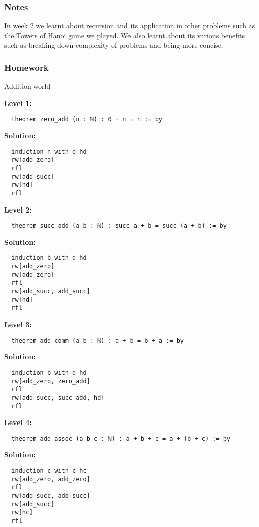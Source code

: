 \documentclass{article}
\theoremstyle{theorem}
\theoremstyle{definition}
\theoremstyle{remark}
\begin{document}
\subsubsection*{Notes}

In week 2 we learnt about recursion and its application in other problems such as the Towers of Hanoi game we played. We also learnt about its various benefits such as breaking down complexity of problems and being more concise.

\subsubsection*{Homework}

Addition world
\begin{enumerate}

  \textbf{Level 1:}
  \begin{verbatim}
  theorem zero_add (n : ℕ) : 0 + n = n := by
  \end{verbatim}

  \textbf{Solution:}
  \begin{verbatim}
  induction n with d hd
  rw[add_zero]
  rfl
  rw[add_succ]
  rw[hd]
  rfl  
  \end{verbatim}

  \textbf{Level 2:}
  \begin{verbatim}
  theorem succ_add (a b : ℕ) : succ a + b = succ (a + b) := by  
  \end{verbatim}

  \textbf{Solution:}
  \begin{verbatim}
  induction b with d hd
  rw[add_zero]
  rw[add_zero]
  rfl
  rw[add_succ, add_succ]
  rw[hd]
  rfl
  \end{verbatim}
  
  \textbf{Level 3:}
  \begin{verbatim}
  theorem add_comm (a b : ℕ) : a + b = b + a := by
  \end{verbatim}

  \textbf{Solution:}
  \begin{verbatim}
  induction b with d hd
  rw[add_zero, zero_add]
  rfl
  rw[add_succ, succ_add, hd]
  rfl
  \end{verbatim}

  \textbf{Level 4:}
  \begin{verbatim}
  theorem add_assoc (a b c : ℕ) : a + b + c = a + (b + c) := by
  \end{verbatim}

  \textbf{Solution:}
  \begin{verbatim}
  induction c with c hc
  rw[add_zero, add_zero]
  rfl
  rw[add_succ, add_succ]
  rw[add_succ]
  rw[hc]
  rfl
  \end{verbatim}


\end{enumerate}
\end{document}
